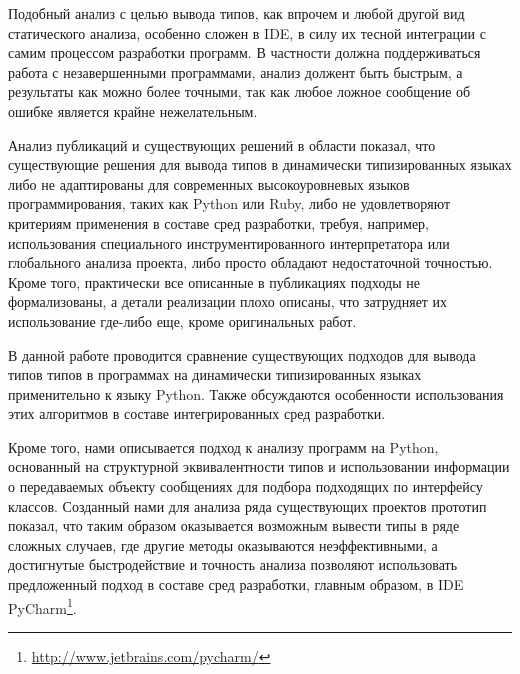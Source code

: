Подобный анализ с целью вывода типов, как впрочем и любой другой вид
статического анализа, особенно сложен в IDE, в силу их тесной
интеграции с самим процессом разработки программ. В частности должна
поддерживаться работа с незавершенными программами, анализ должент быть быстрым,
а результаты как можно более точными, так как любое ложное сообщение об ошибке
является крайне нежелательным.

Анализ публикаций и существующих решений в области показал, что
существующие решения для вывода типов в динамически типизированных языках либо
не адаптированы для современных высокоуровневых языков программирования, таких
как Python или Ruby, либо не удовлетворяют критериям применения в составе сред
разработки, требуя, например, использования специального инструментированного
интерпретатора или глобального анализа проекта, либо просто
обладают недостаточной точностью. Кроме того, практически все описанные в публикациях
подходы не формализованы, а детали реализации плохо описаны, что
затрудняет их использование где-либо еще, кроме оригинальных работ. 

В данной работе проводится сравнение существующих подходов для
вывода типов типов в программах на динамически типизированных языках
применительно к языку Python. Также обсуждаются особенности использования этих
алгоритмов в составе интегрированных сред разработки.

Кроме того, нами описывается подход к анализу программ на Python, основанный на
структурной эквивалентности типов и использовании информации о передаваемых
объекту сообщениях для подбора подходящих по интерфейсу классов. Созданный нами
для анализа ряда существующих проектов прототип показал, что таким образом
оказывается возможным вывести типы в ряде сложных случаев, где другие методы
оказываются неэффективными, а достигнутые быстродействие и точность анализа
позволяют использовать предложенный подход в составе сред разработки, главным
образом, в IDE PyCharm\footnote{\url{http://www.jetbrains.com/pycharm/}}.


